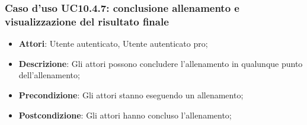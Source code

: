 \subsubsection{Caso d'uso UC10.4.7: conclusione allenamento e visualizzazione del risultato finale}
	\begin{itemize}
		\item \textbf{Attori}: Utente autenticato, Utente autenticato pro;
		\item \textbf{Descrizione}: Gli attori possono concludere l'allenamento in qualunque punto dell'allenamento;
		\item \textbf{Precondizione}: Gli attori stanno eseguendo un allenamento;
		\item \textbf{Postcondizione}: Gli attori hanno concluso l'allenamento;
	\end{itemize}
